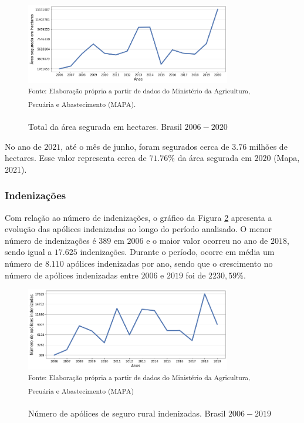 \begin{figure}[H]
	\centering
	\caption{Total da área segurada em hectares. Brasil $2006 - 2020$}
	\includegraphics[width=0.8\textwidth]{figuras/area_segurada.png}\\
	\small \textsuperscript {Fonte: Elaboração própria a partir de dados do Ministério da Agricultura, Pecuária e Abastecimento (MAPA).}
    \label{area_segurada}
\end{figure}

No ano de $2021$, até o mês de junho, foram segurados cerca de $3.76$ milhões de hectares. Esse valor representa cerca de $71.76\%$ da área segurada em $2020$ (Mapa, 2021). 

\subsubsection{Indenizações}

Com relação ao número de indenizações,  o gráfico da Figura \ref{apolices_indenizadas} apresenta a evolução das apólices indenizadas ao longo do período analisado. O menor número de indenizações é $389$ em $2006$ e o maior valor ocorreu no ano de $2018$, sendo igual a $17.625$ indenizações. Durante o período, ocorre em média um número de $8.110$ apólices indenizadas por ano, sendo que o crescimento no número de apólices indenizadas entre $2006$ e $2019$ foi de $2230,59\%$. 

\begin{figure}[H]
	\centering
	\caption{Número de apólices de seguro rural indenizadas. Brasil $2006 - 2019$}
	\includegraphics[width=0.8\textwidth]{figuras/apolices_indenizadas.png}\\
	\small \textsuperscript {Fonte: Elaboração própria a partir de dados do Ministério da Agricultura, Pecuária e Abastecimento (MAPA)}
    \label{apolices_indenizadas}
\end{figure}

